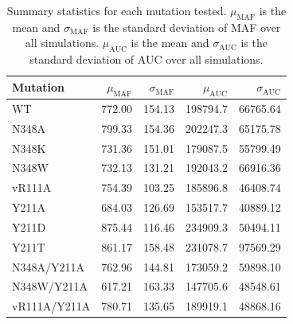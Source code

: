 \documentclass[12pt]{article}
\begin{document}
\clearpage
\begin {table}[H]
\caption{\label{tab:summary_statistics}Summary statistics for each mutation tested. $\mu_\text{MAF}$ is the mean and $\sigma_\text{MAF}$ is the standard deviation of MAF over all simulations. $\mu_\text{AUC}$ is the mean and $\sigma_\text{AUC}$ is the standard deviation of AUC over all simulations.}
\begin{center}
  \resizebox{11cm}{!} {
    \begin{tabular}{l r r r r}
    \hline
      Mutation &      $\mu_\text{MAF}$ & $\sigma_\text{MAF}$ & $\mu_\text{AUC}$ & $\sigma_\text{AUC}$ \\ \hline
            WT &                 772.00 & 154.13               & 198794.7    & 66765.64 \\
         N348A &                 799.33 & 154.36               & 202247.3    & 65175.78 \\
         N348K &                 731.36 & 151.01               & 179087.5    & 55799.49 \\
         N348W &                 732.13 & 131.21               & 192043.2    & 66916.36 \\
        vR111A &                 754.39 & 103.25               & 185896.8    & 46408.74 \\
         Y211A &                 684.03 & 126.69               & 153517.7    & 40889.12 \\ 
         Y211D &                 875.44 & 116.46               & 234909.3    & 50494.11 \\ 
         Y211T &                 861.17 & 158.48               & 231078.7    & 97569.29 \\
   N348A/Y211A &                 762.96 & 144.81               & 173059.2    & 59898.10 \\
   N348W/Y211A &                 617.21 & 163.33               & 147705.6    & 48548.61 \\
  vR111A/Y211A &                 780.71 & 135.65               & 189919.1    & 48868.16 \\
    \hline
    \end{tabular}
  }
\end{center}
\end{table}
\end{document}
